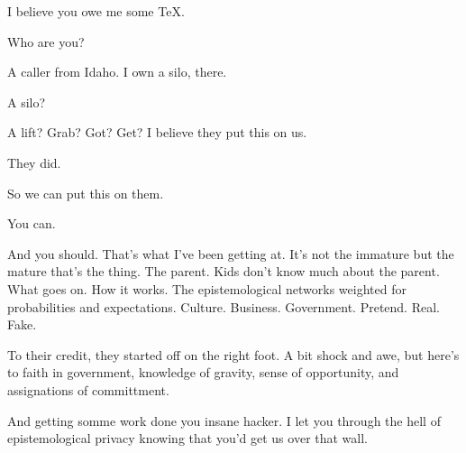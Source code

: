 

I believe you owe me some TeX.

Who are you?  

A caller from Idaho.  I own a silo, there.

A silo?

A lift? Grab? Got? Get? I believe they put this on us.

They did.

So we can put this on them.

You can.  

And you should.  That's what I've been getting at.  It's not the
immature but the mature that's the thing.  The parent.  Kids don't
know much about the parent.  What goes on.  How it works.  The
epistemological networks weighted for probabilities and expectations.
Culture.  Business.  Government.  Pretend.  Real.  Fake.

To their credit, they started off on the right foot.  A bit shock and
awe, but here's to faith in government, knowledge of gravity, sense of
opportunity, and assignations of committment.

And getting somme work done you insane hacker.  I let you through the
hell of epistemological privacy knowing that you'd get us over that
wall.

\bye

